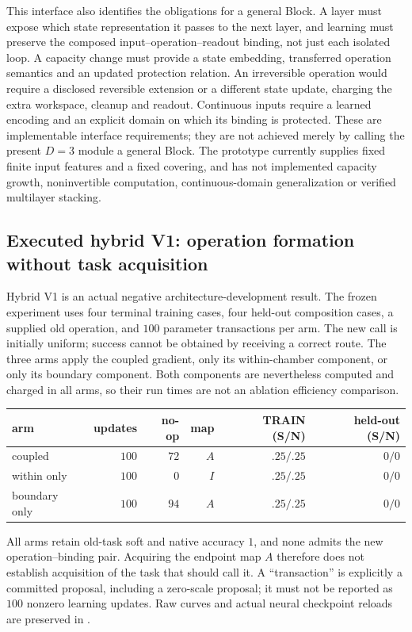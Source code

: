 This interface also identifies the obligations for a general Block. A layer
must expose which state representation it passes to the next layer, and
learning must preserve the composed input--operation--readout binding, not
just each isolated loop. A capacity change must provide a state embedding,
transferred operation semantics and an updated protection relation. An
irreversible operation would require a disclosed reversible extension or a
different state update, charging the extra workspace, cleanup and readout.
Continuous inputs require a learned encoding and an explicit domain on which
its binding is protected. These are implementable interface requirements;
they are not achieved merely by calling the present $D=3$ module a general
Block. The prototype currently supplies fixed finite input features and a
fixed covering, and has not implemented capacity growth, noninvertible
computation, continuous-domain generalization or verified multilayer stacking.

\subsection{Executed hybrid V1: operation formation without task acquisition}

Hybrid V1 is an actual negative architecture-development result. The frozen
experiment uses four terminal training cases, four held-out composition
cases, a supplied old operation, and $100$ parameter transactions per arm.
The new call is initially uniform; success cannot be obtained by receiving a
correct route. The three arms apply the coupled gradient, only its
within-chamber component, or only its boundary component. Both components
are nevertheless computed and charged in all arms, so their run times are
not an ablation efficiency comparison.

\begin{center}
\begin{tabular}{l|rrrrr}
arm & updates & no-op & map
    & TRAIN (S/N) & held-out (S/N)\\\hline
coupled & $100$ & $72$ & $A$ & $.25/.25$ & $0/0$\\
within only & $100$ & $0$ & $I$ & $.25/.25$ & $0/0$\\
boundary only & $100$ & $94$ & $A$ & $.25/.25$ & $0/0$
\end{tabular}
\end{center}

All arms retain old-task soft and native accuracy $1$, and none admits the
new operation--binding pair. Acquiring the endpoint map $A$ therefore does
not establish acquisition of the task that should call it. A ``transaction''
is explicitly a committed proposal, including a zero-scale proposal; it must
not be reported as $100$ nonzero learning updates. Raw curves and actual
neural checkpoint reloads are preserved in
.

